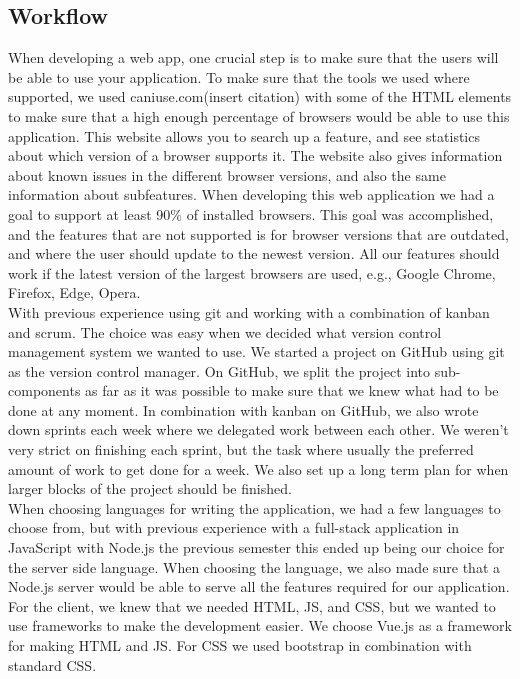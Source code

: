 \subsection{Workflow}
When developing a web app, one crucial step is to make sure that the users will be able to use your application. To make sure that the tools we used where supported, we used caniuse.com(insert citation) with some of the HTML elements to make sure that a high enough percentage of browsers would be able to use this application. This website allows you to search up a feature, and see statistics about which version of a browser supports it. The website also gives information about known issues in the different browser versions, and also the same information about subfeatures. When developing this web application we had a goal to support at least 90\% of installed browsers. This goal was accomplished, and the features that are not supported is for browser versions that are outdated, and where the user should update to the newest version. All our features should work if the latest version of the largest browsers are used, e.g., Google Chrome, Firefox, Edge, Opera.
\\[11pt]
With previous experience using git and working with a combination of kanban and scrum. The choice was easy when we decided what version control management system we wanted to use. We started a project on GitHub using git as the version control manager. On GitHub, we split the project into sub-components as far as it was possible to make sure that we knew what had to be done at any moment. In combination with kanban on GitHub, we also wrote down sprints each week where we delegated work between each other. We weren't very strict on finishing each sprint, but the task where usually the preferred amount of work to get done for a week. We also set up a long term plan for when larger blocks of the project should be finished.
\\[11pt]
When choosing languages for writing the application, we had a few languages to choose from, but with previous experience with a full-stack application in JavaScript with Node.js the previous semester this ended up being our choice for the server side language. When choosing the language, we also made sure that a Node.js server would be able to serve all the features required for our application. For the client, we knew that we needed HTML, JS, and CSS, but we wanted to use frameworks to make the development easier. We choose Vue.js as a framework for making HTML and JS. For CSS we used bootstrap in combination with standard CSS.